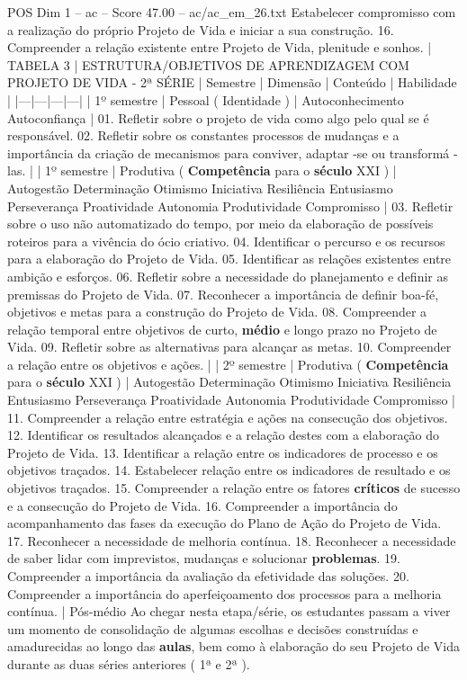 \begin{textsample}{POS Dim 1 – ac – Score 47.00 – ac/ac\_em\_26.txt}
Estabelecer compromisso com a realização do próprio Projeto de Vida e iniciar a sua construção. 16.
Compreender a relação existente entre Projeto de Vida, plenitude e sonhos. | TABELA 3 | ESTRUTURA/OBJETIVOS DE APRENDIZAGEM COM PROJETO DE VIDA - 2ª SÉRIE | Semestre | Dimensão | Conteúdo | Habilidade | |---|---|---|---| | 1º semestre | Pessoal ( Identidade ) | Autoconhecimento Autoconfiança | 01.
Refletir sobre o projeto de vida como algo pelo qual se é responsável. 02.
Refletir sobre os constantes processos de mudanças e a importância da criação de mecanismos para conviver, adaptar -se ou transformá -las. | | 1º semestre | Produtiva ( \textbf{Competência} para o \textbf{século} XXI ) | Autogestão Determinação Otimismo Iniciativa Resiliência Entusiasmo Perseverança Proatividade Autonomia Produtividade Compromisso | 03.
Refletir sobre o uso não automatizado do tempo, por meio da elaboração de possíveis roteiros para a vivência do ócio criativo. 04.
Identificar o percurso e os recursos para a elaboração do Projeto de Vida. 05.
Identificar as relações existentes entre ambição e esforços. 06.
Refletir sobre a necessidade do planejamento e definir as premissas do Projeto de Vida. 07.
Reconhecer a importância de definir boa-fé, objetivos e metas para a construção do Projeto de Vida. 08.
Compreender a relação temporal entre objetivos de curto, \textbf{médio} e longo prazo no Projeto de Vida. 09.
Refletir sobre as alternativas para alcançar as metas. 10.
Compreender a relação entre os objetivos e ações. | | 2º semestre | Produtiva ( \textbf{Competência} para o \textbf{século} XXI ) | Autogestão Determinação Otimismo Iniciativa Resiliência Entusiasmo Perseverança Proatividade Autonomia Produtividade Compromisso | 11.
Compreender a relação entre estratégia e ações na consecução dos objetivos. 12.
Identificar os resultados alcançados e a relação destes com a elaboração do Projeto de Vida. 13.
Identificar a relação entre os indicadores de processo e os objetivos traçados. 14.
Estabelecer relação entre os indicadores de resultado e os objetivos traçados. 15.
Compreender a relação entre os fatores \textbf{críticos} de sucesso e a consecução do Projeto de Vida. 16.
Compreender a importância do acompanhamento das fases da execução do Plano de Ação do Projeto de Vida. 17.
Reconhecer a necessidade de melhoria contínua. 18.
Reconhecer a necessidade de saber lidar com imprevistos, mudanças e solucionar \textbf{problemas}. 19.
Compreender a importância da avaliação da efetividade das soluções. 20.
Compreender a importância do aperfeiçoamento dos processos para a melhoria contínua. | Pós-médio Ao chegar nesta etapa/série, os estudantes passam a viver um momento de consolidação de algumas escolhas e decisões construídas e amadurecidas ao longo das \textbf{aulas}, bem como à elaboração do seu Projeto de Vida durante as duas séries anteriores ( 1ª e 2ª ).

\end{textsample}
